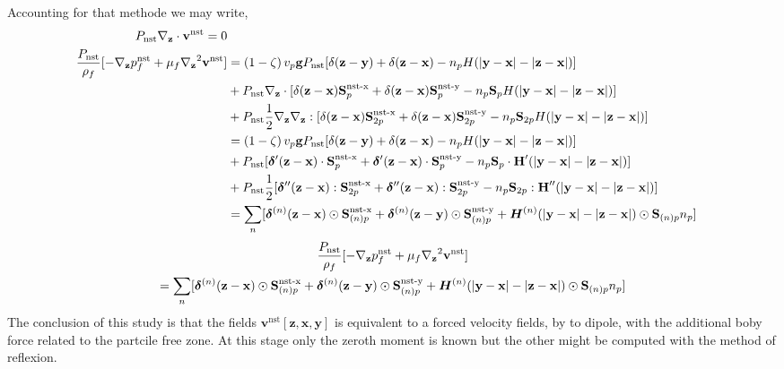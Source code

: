Accounting for that methode we may write, 
\begin{align*}
    P_\text{nst} {\mathbf{\nabla}_\textbf{z}} \cdot  \textbf{v}^\text{nst} = 0 \\
    \frac{P_\text{nst}}{\rho_f}[
        - {\mathbf{\nabla}_\textbf{z}} p_f^\text{nst}
        + \mu_f {\mathbf{\nabla}_\textbf{z}}^2 \textbf{v}^\text{nst}
    ]
   & = 
    \left(1-\zeta\right)  v_p \textbf{g} P_\text{nst} [\delta(\textbf{z} - \textbf{y}) + \delta(\textbf{z} - \textbf{x}) - n_p H(|\textbf{y} - \textbf{x}| - |\textbf{z} - \textbf{x}|)]  \\
    &+P_\text{nst}{\mathbf{\nabla}_\textbf{z}}\cdot  [\delta(\textbf{z} - \textbf{x}) \textbf{S}_p^\text{nst-x}
    +\delta(\textbf{z} - \textbf{x}) \textbf{S}_p^\text{nst-y}
    - n_p \textbf{S}_p H(|\textbf{y} - \textbf{x}| - |\textbf{z} - \textbf{x}|)
    ]\\
    &+P_\text{nst}\frac{1}{2}{\mathbf{\nabla}_\textbf{z}}{\mathbf{\nabla}_\textbf{z}}:   [\delta(\textbf{z} - \textbf{x}) \textbf{S}_{2p}^\text{nst-x}
    +\delta(\textbf{z} - \textbf{x}) \textbf{S}_{2p}^\text{nst-y}
    - n_p \textbf{S}_{2p} H(|\textbf{y} - \textbf{x}| - |\textbf{z} - \textbf{x}|)
    ]\\
   & = 
    \left(1-\zeta\right)  v_p \textbf{g} P_\text{nst} [\delta(\textbf{z} - \textbf{y}) + \delta(\textbf{z} - \textbf{x}) - n_p H(|\textbf{y} - \textbf{x}| - |\textbf{z} - \textbf{x}|)]  \\
    &+P_\text{nst}  [\bm\delta'(\textbf{z} - \textbf{x})\cdot  \textbf{S}_p^\text{nst-x}
    +\bm\delta'(\textbf{z} - \textbf{x}) \cdot  \textbf{S}_p^\text{nst-y}
    - n_p \textbf{S}_p \cdot \textbf{H}'(|\textbf{y} - \textbf{x}| - |\textbf{z} - \textbf{x}|)
    ]\\
    &+P_\text{nst}\frac{1}{2}   [\bm\delta''(\textbf{z} - \textbf{x}) :  \textbf{S}_{2p}^\text{nst-x}
    +\bm\delta''(\textbf{z} - \textbf{x}) : \textbf{S}_{2p}^\text{nst-y}
    - n_p \textbf{S}_{2p} : \textbf{H}''(|\textbf{y} - \textbf{x}| - |\textbf{z} - \textbf{x}|)
    ]\\
    &= \sum_n [\bm\delta^{(n)}(\textbf{z} - \textbf{x}) \odot   \textbf{S}_{(n)p}^\text{nst-x}
    + \bm\delta^{(n)}(\textbf{z} - \textbf{y}) \odot   \textbf{S}_{(n)p}^\text{nst-y}
    + \bm H^{(n)}(|\textbf{y} - \textbf{x}| - |\textbf{z} - \textbf{x}|) \odot   \textbf{S}_{(n)p} n_p]
\end{align*}
\begin{multline}
    \frac{P_\text{nst}}{\rho_f}[
        - {\mathbf{\nabla}_\textbf{z}} p_f^\text{nst}
        + \mu_f {\mathbf{\nabla}_\textbf{z}}^2 \textbf{v}^\text{nst}
    ]\\
    = \sum_n [\bm\delta^{(n)}(\textbf{z} - \textbf{x}) \odot   \textbf{S}_{(n)p}^\text{nst-x}
    + \bm\delta^{(n)}(\textbf{z} - \textbf{y}) \odot   \textbf{S}_{(n)p}^\text{nst-y}
    + \bm H^{(n)}(|\textbf{y} - \textbf{x}| - |\textbf{z} - \textbf{x}|) \odot   \textbf{S}_{(n)p} n_p]
\end{multline}
The conclusion of this study is that the fields $\textbf{v}^\text{nst}[\textbf{z},\textbf{x},\textbf{y}]$ is equivalent to a forced velocity fields, by to dipole, with the additional boby force related to the partcile free zone. 
At this stage only the zeroth moment is known but the other might be computed with the method of reflexion. 



